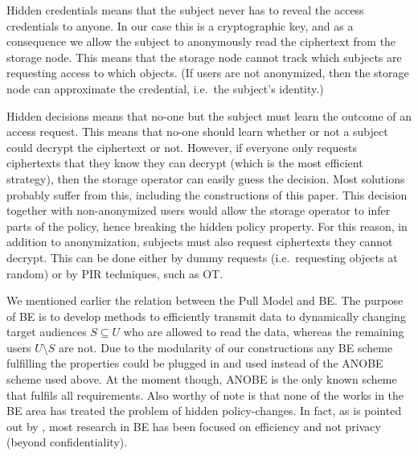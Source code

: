 
Hidden credentials means that the subject never has to reveal the access 
credentials to anyone.
In our case this is a cryptographic key, and as a consequence we allow the 
subject to anonymously read the ciphertext from the storage node.
This means that the storage node cannot track which subjects are requesting 
access to which objects.
(If users are not anonymized, then the storage node can approximate the 
credential, i.e.\ the subject's identity.)

Hidden decisions means that no-one but the subject must learn the outcome of an 
access request.
This means that no-one should learn whether or not a subject could decrypt the 
ciphertext or not.
However, if everyone only requests ciphertexts that they know they can decrypt 
(which is the most efficient strategy), then the storage operator can easily 
guess the decision.
Most solutions probably suffer from this, including the constructions of this 
paper.
This decision together with non-anonymized users would allow the storage 
operator to infer parts of the policy, hence breaking the hidden policy 
property.
For this reason, in addition to anonymization, subjects must also request 
ciphertexts they cannot decrypt.
This can be done either by dummy requests (i.e.\ requesting objects at random) 
or by \ac{PIR} techniques, such as \ac{OT}.

We mentioned earlier the relation between the Pull Model and \ac{BE}.
The purpose of \ac{BE} is to develop methods to efficiently transmit data to 
dynamically changing target audiences \(S\subseteq U\) who are allowed to read 
the data, whereas the remaining users \(U\setminus S\) are not.
Due to the modularity of our constructions any \ac{BE} scheme fulfilling the 
properties could be plugged in and used instead of the \ac{ANOBE} scheme used 
above.
At the moment though, \ac{ANOBE} is the only known scheme that fulfils all 
requirements.
Also worthy of note is that none of the works in the \ac{BE} area has treated 
the problem of hidden policy-changes.
In fact, as is pointed out by \citet{ANOBE}, most research in \ac{BE} has been 
focused on efficiency and not privacy (beyond confidentiality).

